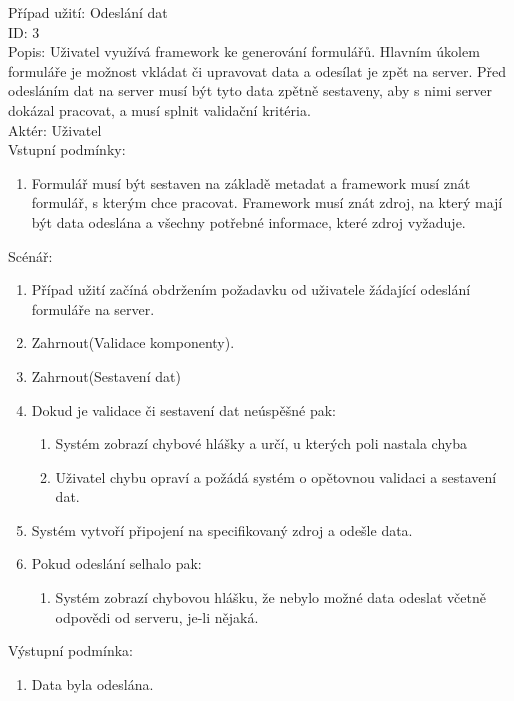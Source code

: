 Případ užití: Odeslání dat\\
ID: 3\\
Popis: 
Uživatel využívá framework ke generování formulářů. Hlavním úkolem formuláře je možnost vkládat či upravovat data a odesílat je zpět na server. Před odesláním dat na server musí být tyto data zpětně sestaveny, aby s nimi server dokázal pracovat, a musí splnit validační kritéria.
\\
Aktér: Uživatel\\
Vstupní podmínky:
\begin{enumerate}
\item Formulář musí být sestaven na základě metadat a framework musí znát formulář, s kterým chce pracovat. Framework musí znát zdroj, na který mají být data odeslána a všechny potřebné informace, které zdroj vyžaduje.
\end{enumerate}
Scénář:
\begin{enumerate}
\item Případ užití začíná obdržením požadavku od uživatele žádající odeslání formuláře na server.
\item Zahrnout(Validace komponenty).
\item Zahrnout(Sestavení dat)
\item Dokud je validace či sestavení dat neúspěšné pak:
\begin{enumerate}
\item Systém zobrazí chybové hlášky a určí, u kterých poli nastala chyba
\item Uživatel chybu opraví a požádá systém o opětovnou validaci a sestavení dat.
\end{enumerate}
\item Systém vytvoří připojení na specifikovaný zdroj a odešle data.
\item Pokud odeslání selhalo pak:
\begin{enumerate}
\item Systém zobrazí chybovou hlášku, že nebylo možné data odeslat včetně odpovědi od serveru, je-li nějaká.
\end{enumerate}
\end{enumerate}

Výstupní podmínka:
\begin{enumerate}
\item Data byla odeslána.
\end{enumerate}


